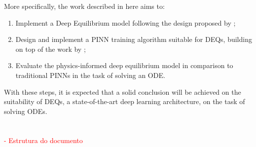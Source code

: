 More specifically, the work described in here aims to:
\begin{enumerate}
    \item Implement a Deep Equilibrium model following the design proposed by \textcite{Bai2019};
    
    \item Design and implement a \gls{PINN} training algorithm suitable for \gls{DEQ}s, building on top of the work by \textcite{Raissi2019};
    \item Evaluate the physics-informed deep equilibrium model in comparison to traditional \gls{PINN}s in the task of solving an \gls{ODE}.
\end{enumerate}
With these steps, it is expected that a solid conclusion will be achieved on the suitability of \gls{DEQ}s, a state-of-the-art deep learning architecture, on the task of solving \gls{ODE}s.





\section*{}

\textcolor{red}{- Estrutura do documento}
